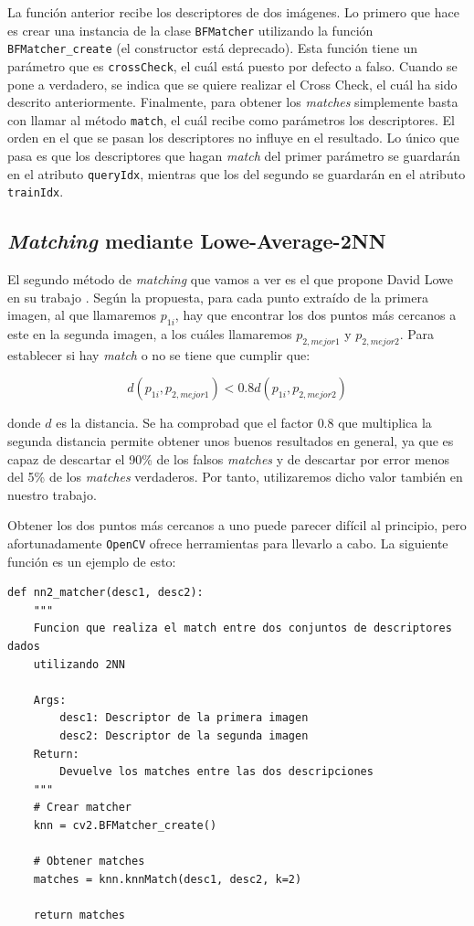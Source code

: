 \documentclass[11pt,a4paper]{article}
\begin{document}
La función anterior recibe los descriptores de dos imágenes. Lo primero que
hace es crear una instancia de la clase \texttt{BFMatcher} utilizando la función
\texttt{BFMatcher\_create} (el constructor está deprecado). Esta función tiene
un parámetro que es \texttt{crossCheck}, el cuál está puesto por defecto a falso.
Cuando se pone a verdadero, se indica que se quiere realizar el Cross Check, el cuál
ha sido descrito anteriormente. Finalmente, para obtener los \textit{matches} simplemente
basta con llamar al método \texttt{match}, el cuál recibe como parámetros los
descriptores. El orden en el que se pasan los descriptores no influye en el resultado. Lo
único que pasa es que los descriptores que hagan \textit{match} del primer parámetro
se guardarán en el atributo \texttt{queryIdx}, mientras que los  del segundo se guardarán
en el atributo \texttt{trainIdx}.

\subsection{\textit{Matching} mediante Lowe-Average-2NN}

El segundo método de \textit{matching} que vamos a ver es el que propone
David Lowe en su trabajo \cite{lowe}. Según la propuesta, para cada punto extraído
de la primera imagen, al que llamaremos $p_{1i}$, hay que encontrar los dos puntos
más cercanos a este en la segunda imagen, a los cuáles llamaremos $p_{2,mejor1}$
y $p_{2,mejor2}$. Para establecer si hay \textit{match} o no se tiene que cumplir
que:

\begin{equation}
	d(p_{1i}, p_{2,mejor1}) < 0.8 d(p_{1i}, p_{2,mejor2})
\end{equation}

\noindent donde $d$ es la distancia. Se ha comprobad que el factor $0.8$ que multiplica
la segunda distancia permite obtener unos buenos resultados en general, ya que es capaz
de descartar el 90\% de los falsos \textit{matches} y de descartar por error menos del 5\%
de los \textit{matches} verdaderos. Por tanto, utilizaremos dicho valor también en nuestro trabajo.

Obtener los dos puntos más cercanos a uno puede parecer difícil al principio, pero afortunadamente
\texttt{OpenCV} ofrece herramientas para llevarlo a cabo. La siguiente función es un ejemplo de esto:

\begin{lstlisting}
def nn2_matcher(desc1, desc2):
    """
    Funcion que realiza el match entre dos conjuntos de descriptores dados
    utilizando 2NN

    Args:
        desc1: Descriptor de la primera imagen
        desc2: Descriptor de la segunda imagen
    Return:
        Devuelve los matches entre las dos descripciones
    """
    # Crear matcher
    knn = cv2.BFMatcher_create()

    # Obtener matches
    matches = knn.knnMatch(desc1, desc2, k=2)

    return matches
\end{lstlisting}
\end{document}
